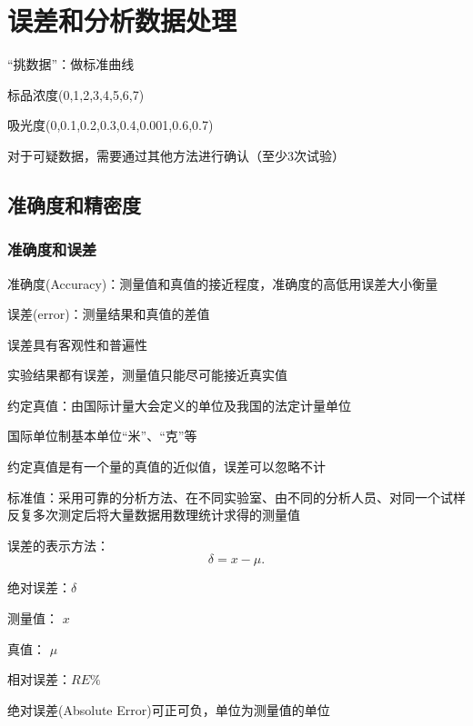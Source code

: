 \section{误差和分析数据处理}%
\label{sec:误差和分析数据处理}
\begin{notation}
    “挑数据”：做标准曲线

    标品浓度(0,1,2,3,4,5,6,7)

    吸光度(0,0.1,0.2,0.3,0.4,0.001,0.6,0.7)

    对于可疑数据，需要通过其他方法进行确认（至少3次试验）
\end{notation}
\subsection{准确度和精密度}%
\label{sub:准确度和精密度}
\subsubsection{准确度和误差}%
\label{subsub:准确度和误差}
\begin{defi}
    准确度(Accuracy)：测量值和真值的接近程度，准确度的高低用误差大小衡量
\end{defi}
\begin{defi}
    误差(error)：测量结果和真值的差值
\end{defi}
误差具有客观性和普遍性

实验结果都有误差，测量值只能尽可能接近真实值
\begin{defi}
    约定真值：由国际计量大会定义的单位及我国的法定计量单位
    \begin{eg}
        国际单位制基本单位“米”、“克”等
    \end{eg}
    \begin{notation}
        约定真值是有一个量的真值的近似值，误差可以忽略不计
    \end{notation}
\end{defi}

\begin{defi}
    标准值：采用可靠的分析方法、在不同实验室、由不同的分析人员、对同一个试样反复多次测定后将大量数据用数理统计求得的测量值
\end{defi}
误差的表示方法：\[
    \delta=x-\mu
.\] 
\begin{defi}
    绝对误差：$\delta$

    测量值： $x$

    真值： $\mu$ 

    相对误差：$RE\%$
\end{defi}
绝对误差(Absolute Error)可正可负，单位为测量值的单位

